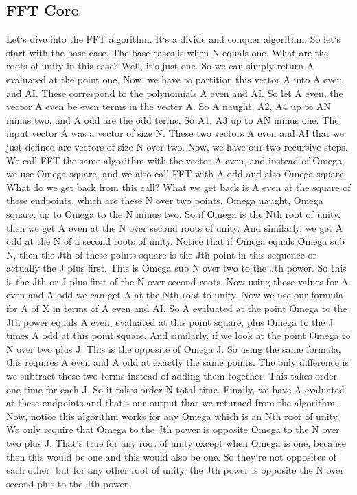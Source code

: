 \subsection{FFT  Core}
Let`s dive into the FFT algorithm.
It`s a divide and conquer algorithm.
So let`s start with the base case.
The base cases is when N equals one.
What are the roots of unity in this case? Well, it`s just one.
So we can simply return A evaluated at the point one.
Now, we have to partition this vector A into A even and AI\@.
These correspond to the polynomials A even and AI\@.
So let A even, the vector A even be even terms in the vector A\@.
So A naught, A2, A4 up to AN minus two, and A odd are the odd terms.
So A1, A3 up to AN minus one.
The input vector A was a vector of size N\@.
These two vectors A even and AI that we just defined are vectors of size N over two.
Now, we have our two recursive steps.
We call FFT the same algorithm with the vector A even, and instead of Omega, we use Omega square, and we also call FFT with A odd and also Omega square.
What do we get back from this call? What we get back is A even at the square of these endpoints, which are these N over two points.
Omega naught, Omega square, up to Omega to the N minus two.
So if Omega is the Nth root of unity, then we get A even at the N over second roots of unity.
And similarly, we get A odd at the N of a second roots of unity.
Notice that if Omega equals Omega sub N, then the Jth of these points square is the Jth point in this sequence or actually the J plus first.
This is Omega sub N over two to the Jth power.
So this is the Jth or J plus first of the N over second roots.
Now using these values for A even and A odd we can get A at the Nth root to unity.
Now we use our formula for A of X in terms of A even and AI\@.
So A evaluated at the point Omega to the Jth power equals A even, evaluated at this point square, plus Omega to the J times A odd at this point square.
And similarly, if we look at the point Omega to N over two plus J\@.
This is the opposite of Omega J\@.
So using the same formula, this requires A even and A odd at exactly the same points.
The only difference is we subtract these two terms instead of adding them together.
This takes order one time for each J\@.
So it takes order N total time.
Finally, we have A evaluated at these endpoints and that`s our output that we returned from the algorithm.
Now, notice this algorithm works for any Omega which is an Nth root of unity.
We only require that Omega to the Jth power is opposite Omega to the N over two plus J\@.
That`s true for any root of unity except when Omega is one, because then this would be one and this would also be one.
So they`re not opposites of each other, but for any other root of unity, the Jth power is opposite the N over second plus to the Jth power.

